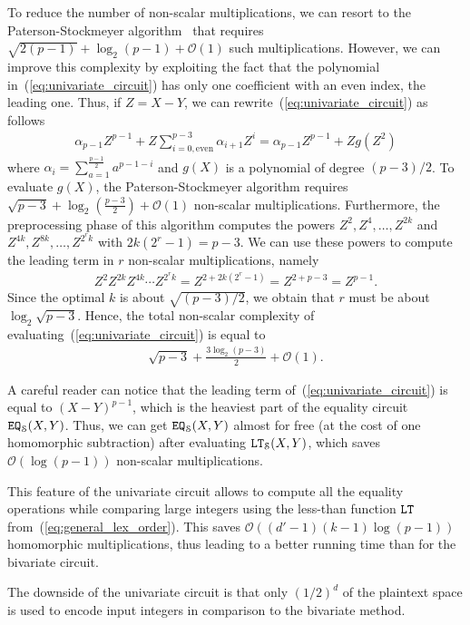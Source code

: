   To reduce the number of non-scalar multiplications, we can resort to the Paterson-Stockmeyer algorithm~\cite{SIAM:PS73} that requires $\sqrt{2(p-1)} + \log_2 (p-1) + \mathcal{O}(1)$ such multiplications.
  However, we can improve this complexity by exploiting the fact that the polynomial in~(\ref{eq:univariate_circuit}) has only one coefficient with an even index, the leading one.
  Thus, if $Z=X-Y$, we can rewrite~(\ref{eq:univariate_circuit}) as follows
  \begin{align*}
    \alpha_{p-1} Z^{p-1} + Z \sum_{i=0, \text{even}}^{p-3} \alpha_{i+1} Z^i =  \alpha_{p-1} Z^{p-1} + Z g(Z^2)
  \end{align*}
  where $\alpha_i = \sum_{a=1}^{\frac{p-1}{2}} a^{p-1-i}$ and $g(X)$ is a polynomial of degree $(p-3)/2$.
  To evaluate $g(X)$, the Paterson-Stockmeyer algorithm requires $\sqrt{p-3} + \log_2 \left(\frac{p-3}{2}\right) + \mathcal{O}(1)$ non-scalar multiplications.
  Furthermore, the preprocessing phase of this algorithm computes the powers $Z^2, Z^4, \dots, Z^{2k}$ and $Z^{4k}, Z^{8k}, \dots, Z^{2^r k}$ with $2k(2^r-1) = p-3$.
  We can use these powers to compute the leading term in $r$ non-scalar multiplications, namely
  \begin{align*}
    Z^2 Z^{2k} Z^{4k} \cdots Z^{2^r k} = Z^{2 + 2k(2^r-1)} = Z^{2 + p - 3} = Z^{p-1}.
  \end{align*}
  Since the optimal $k$ is about $\sqrt{(p-3)/2}$, we obtain that $r$ must be about $\log_2 \sqrt{p-3}$.
  Hence, the total non-scalar complexity of evaluating~(\ref{eq:univariate_circuit}) is equal to
  \begin{align*}
    \sqrt{p-3} + \frac{3 \log_2 \left(p-3\right)}{2} + \mathcal{O}(1).
  \end{align*}
  
  \begin{remark}
    A careful reader can notice that the leading term of~(\ref{eq:univariate_circuit}) is equal to $(X-Y)^{p-1}$, which is the heaviest part of the equality circuit $\mathtt{EQ}_{\mathcal{S}}(X,Y)$.
    Thus, we can get $\mathtt{EQ}_{\mathcal{S}}(X,Y)$ almost for free (at the cost of one homomorphic subtraction) after evaluating $\mathtt{LT}_{\mathcal{S}}(X,Y)$, which saves $\mathcal{O}(\log (p-1))$ non-scalar multiplications.

    This feature of the univariate circuit allows to compute all the equality operations while comparing large integers using the less-than function $\mathtt{LT}$ from~(\ref{eq:general_lex_order}).
    This saves $\mathcal{O}((d'-1)(k-1) \log (p-1))$ homomorphic multiplications, thus leading to a better running time than for the bivariate circuit.

    The downside of the univariate circuit is that only $(1/2)^d$ of the plaintext space is used to encode input integers in comparison to the bivariate method.
  \end{remark}


